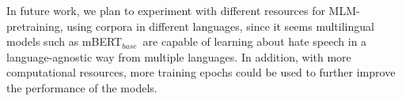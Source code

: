 \documentclass[11pt]{article}
\newcommand{\mbert}{\mbox{mBERT$_{base}$}}
\begin{document}
In future work, we plan to experiment with different resources for MLM-pretraining, using corpora in different languages, since it seems multilingual models such as \mbert\, are capable of learning about hate speech in a language-agnostic way from multiple languages. In addition, with more computational resources, more training epochs could be used to further improve the performance of the models.







\end{document}
